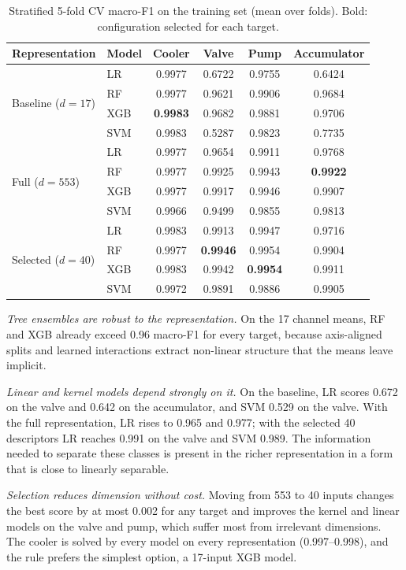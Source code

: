 \documentclass[conference]{IEEEtran}
\begin{document}
\begin{table}[t]
\centering
\caption{Stratified 5-fold CV macro-F1 on the training set (mean over folds). Bold: configuration selected for each target.}
\label{tab:cv}
\begin{tabular}{@{}llcccc@{}}
\toprule
Representation & Model & Cooler & Valve & Pump & Accumulator \\
\midrule
\multirow{4}{*}{Baseline ($d=17$)}
 & LR  & 0.9977 & 0.6722 & 0.9755 & 0.6424 \\
 & RF  & 0.9977 & 0.9621 & 0.9906 & 0.9684 \\
 & XGB & \textbf{0.9983} & 0.9682 & 0.9881 & 0.9706 \\
 & SVM & 0.9983 & 0.5287 & 0.9823 & 0.7735 \\
\midrule
\multirow{4}{*}{Full ($d=553$)}
 & LR  & 0.9977 & 0.9654 & 0.9911 & 0.9768 \\
 & RF  & 0.9977 & 0.9925 & 0.9943 & \textbf{0.9922} \\
 & XGB & 0.9977 & 0.9917 & 0.9946 & 0.9907 \\
 & SVM & 0.9966 & 0.9499 & 0.9855 & 0.9813 \\
\midrule
\multirow{4}{*}{Selected ($d=40$)}
 & LR  & 0.9983 & 0.9913 & 0.9947 & 0.9716 \\
 & RF  & 0.9977 & \textbf{0.9946} & 0.9954 & 0.9904 \\
 & XGB & 0.9983 & 0.9942 & \textbf{0.9954} & 0.9911 \\
 & SVM & 0.9972 & 0.9891 & 0.9886 & 0.9905 \\
\bottomrule
\end{tabular}
\end{table}

\textit{Tree ensembles are robust to the representation.} On the 17 channel
means, RF and XGB already exceed 0.96 macro-F1 for every target, because
axis-aligned splits and learned interactions extract non-linear structure that
the means leave implicit.

\textit{Linear and kernel models depend strongly on it.} On the baseline, LR
scores 0.672 on the valve and 0.642 on the accumulator, and SVM 0.529 on the
valve. With the full representation, LR rises to 0.965 and 0.977; with the
selected 40 descriptors LR reaches 0.991 on the valve and SVM 0.989. The
information needed to separate these classes is present in the richer
representation in a form that is close to linearly separable.

\textit{Selection reduces dimension without cost.} Moving from 553 to 40
inputs changes the best score by at most 0.002 for any target and improves the
kernel and linear models on the valve and pump, which suffer most from
irrelevant dimensions. The cooler is solved by every model on every
representation (0.997--0.998), and the rule prefers the simplest option, a
17-input XGB model.
\end{document}
